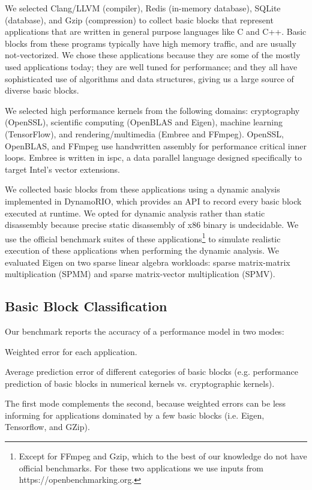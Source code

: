 We selected Clang/LLVM\cite{llvm} (compiler),
Redis (in-memory database), SQLite (database), and Gzip (compression)
to collect basic blocks that represent
applications that are written in general purpose languages
like C and C++.
Basic blocks from these programs
typically have high memory traffic, and are usually not-vectorized.
We chose these applications because they are some of the mostly used
applications today; they are well tuned for performance;
and they all have sophisticated use of algorithms and data structures,
giving us a large source of diverse basic blocks.

We selected high performance kernels from the following domains:
cryptography (OpenSSL), scientific computing (OpenBLAS and Eigen),
machine learning (TensorFlow\cite{tensorflow}),
and rendering/multimedia (Embree\cite{embree} and FFmpeg).
OpenSSL, OpenBLAS, and FFmpeg use handwritten assembly for performance critical inner loops.
Embree is written in ispc\cite{ispc}, a data parallel language
designed specifically to target Intel's vector extensions.

We collected basic blocks from these applications using
a dynamic analysis implemented in DynamoRIO\cite{dynamorio},
which provides an API to record every basic block
executed at runtime.
We opted for dynamic analysis rather than static disassembly
because precise static disassembly of x86 binary
is undecidable.
We use the official benchmark suites of these applications\footnote{
Except for FFmpeg and Gzip, which to the best of our knowledge do not have
official benchmarks. For these two applications we use inputs
from https://openbenchmarking.org.
} to simulate realistic execution of these applications when performing
the dynamic analysis.
We evaluated Eigen on two sparse linear algebra workloads:
sparse matrix-matrix multiplication (SPMM) and 
sparse matrix-vector multiplication (SPMV).

\subsection{Basic Block Classification}\label{classification}
Our benchmark reports the accuracy of a performance model in two modes:
\begin{enumerate*}
\item Weighted error for each application.
\item Average prediction error of different categories of 
basic blocks (e.g. performance prediction
of basic blocks in numerical kernels vs.
cryptographic kernels).
\end{enumerate*}
The first mode complements the second,
because weighted errors can be less informing 
for applications dominated by a few basic blocks
(i.e. Eigen, Tensorflow, and GZip).



